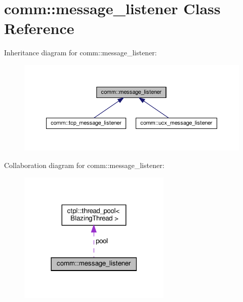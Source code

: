 \hypertarget{classcomm_1_1message__listener}{}\section{comm\+:\+:message\+\_\+listener Class Reference}
\label{classcomm_1_1message__listener}


Inheritance diagram for comm\+:\+:message\+\_\+listener\+:\nopagebreak
\begin{figure}[H]
\begin{center}
\leavevmode
\includegraphics[width=350pt]{classcomm_1_1message__listener__inherit__graph}
\end{center}
\end{figure}


Collaboration diagram for comm\+:\+:message\+\_\+listener\+:\nopagebreak
\begin{figure}[H]
\begin{center}
\leavevmode
\includegraphics[width=206pt]{classcomm_1_1message__listener__coll__graph}
\end{center}
\end{figure}
